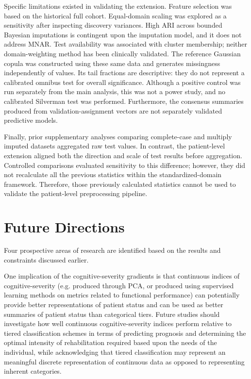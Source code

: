 Specific limitations existed in validating the extension. Feature selection was based on the historical full cohort. Equal-domain scaling was explored as a sensitivity after inspecting discovery variances. High ARI across bounded Bayesian imputations is contingent upon the imputation model, and it does not address MNAR. Test availability was associated with cluster membership; neither domain-weighting method has been clinically validated. The reference Gaussian copula was constructed using these same data and generates missingness independently of values. Its tail fractions are descriptive: they do not represent a calibrated omnibus test for overall significance. Although a positive control was run separately from the main analysis, this was not a power study, and no calibrated Silverman test was performed. Furthermore, the consensus summaries produced from validation-assignment vectors are not separately validated predictive models.

Finally, prior supplementary analyses comparing complete-case and multiply imputed datasets aggregated raw test values. In contrast, the patient-level extension aligned both the direction and scale of test results before aggregation. Controlled comparisons evaluated sensitivity to this difference; however, they did not recalculate all the previous statistics within the standardized-domain framework. Therefore, those previously calculated statistics cannot be used to validate the patient-level preprocessing pipeline.

\section{Future Directions}\label{sec:future}
Four prospective areas of research are identified based on the results and constraints discussed earlier.

One implication of the cognitive-severity gradients is that continuous indices of cognitive-severity (e.g. produced through PCA, or produced using supervised learning methods on metrics related to functional performance) can potentially provide better representations of patient status and can be used as better summaries of patient status than categorical tiers. Future studies should investigate how well continuous cognitive-severity indices perform relative to tiered classification schemes in terms of predicting prognosis and determining the optimal intensity of rehabilitation required based upon the needs of the individual, while acknowledging that tiered classification may represent an meaningful discrete representation of continuous data as opposed to representing inherent categories.

